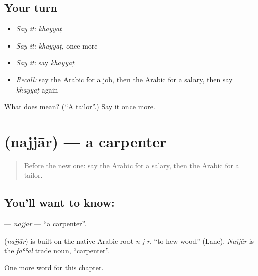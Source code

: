 \subsection*{Your turn}
\begin{itemize}
\raggedright
  \item \emph{Say it:} \emph{khayyāṭ}
  \item \emph{Say it:} \emph{khayyāṭ}, once more
  \item \emph{Say it:} say \emph{khayyāṭ}
  \item \emph{Recall:} say the Arabic for a job, then the Arabic for a salary, then say \emph{khayyāṭ} again
\end{itemize}

\begin{tcolorbox}[breakable,colback=teal!4,colframe=teal!35!black,title={Before you move on}]
What does  mean? (\textquotedblleft{}A tailor\textquotedblright{}.) Say it once more.
\end{tcolorbox}
\section[\texorpdfstring{\ar{نجار} (najjār)}{نجار (najjār)}]{ (najjār) — a carpenter}

\label{lesson:AR-C144-najjar}



\begin{quote}
Before the new one: say the Arabic for a salary, then the Arabic for a tailor.
\end{quote}

\subsection*{You'll want to know: }
\textbf{} — \emph{najjār} — \textquotedblleft{}a carpenter\textquotedblright{}.

\begin{cousinweb}
\textbf{} (\emph{najjār}) is built on the native Arabic root \emph{n-j-r}, \textquotedblleft{}to hew wood\textquotedblright{} (Lane). \emph{Najjār} is the \emph{faʿʿāl} trade noun, \textquotedblleft{}carpenter\textquotedblright{}.
\end{cousinweb}

\begin{grammarlens}[title={What you've built}]
One more word for this chapter.
\end{grammarlens}

